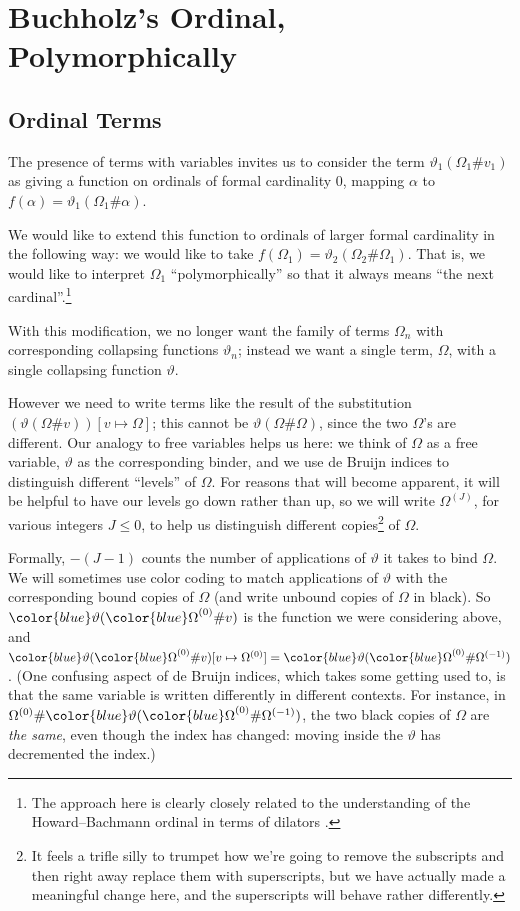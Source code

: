 \documentclass[11pt]{amsart}
\theoremstyle{definition}
\begin{document}
\section{Buchholz's Ordinal, Polymorphically}

\subsection{Ordinal Terms}

The presence of terms with variables invites us to consider the term $\vartheta_1(\Omega_1\#v_1)$ as giving a function on ordinals of formal cardinality $0$, mapping $\alpha$ to $f(\alpha)=\vartheta_1(\Omega_1\#\alpha)$.

We would like to extend this function to ordinals of larger formal cardinality in the following way: we would like to take $f(\Omega_1)=\vartheta_2(\Omega_2\#\Omega_1)$. That is, we would like to interpret $\Omega_1$ ``polymorphically'' so that it always means ``the next cardinal''.\footnote{The approach here is clearly closely related to the understanding of the Howard--Bachmann ordinal in terms of dilators \cite{MR656793,girard_logical_complexity,MR3994445}.}

With this modification, we no longer want the family of terms $\Omega_n$ with corresponding collapsing functions $\vartheta_n$; instead we want a single term, $\Omega$, with a single collapsing function $\vartheta$.

However we need to write terms like the result of the substitution $(\vartheta(\Omega\#v))[v\mapsto\Omega]$; this cannot be $\vartheta(\Omega\#\Omega)$, since the two $\Omega$'s are different. Our analogy to free variables helps us here: we think of $\Omega$ as a free variable, $\vartheta$ as the corresponding binder, and we use de Bruijn indices to distinguish different ``levels'' of $\Omega$. For reasons that will become apparent, it will be helpful to have our levels go down rather than up, so we will write $\Omega^{(J)}$, for various integers $J\leq 0$, to help us distinguish different copies\footnote{It feels a trifle silly to trumpet how we're going to remove the subscripts and then right away replace them with superscripts, but we have actually made a meaningful change here, and the superscripts will behave rather differently.} of $\Omega$.

Formally, $-(J-1)$ counts the number of applications of $\vartheta$ it takes to bind $\Omega$. We will sometimes use color coding to match applications of $\vartheta$ with the corresponding bound copies of $\Omega$ (and write unbound copies of $\Omega$ in black). So ${\color{blue}\vartheta}({\color{blue}\Omega}^{(0)}\#v)$ is the function we were considering above, and ${\color{blue}\vartheta}({\color{blue}\Omega}^{(0)}\#v)[v\mapsto\Omega^{(0)}]={\color{blue}\vartheta}({\color{blue}\Omega}^{(0)}\#\Omega^{(-1)})$. (One confusing aspect of de Bruijn indices, which takes some getting used to, is that the same variable is written differently in different contexts. For instance, in $\Omega^{(0)}\#{\color{blue}\vartheta}({\color{blue}\Omega}^{(0)}\#\Omega^{(-1)})$, the two black copies of $\Omega$ are \emph{the same}, even though the index has changed: moving inside the $\vartheta$ has decremented the index.)
\end{document}

